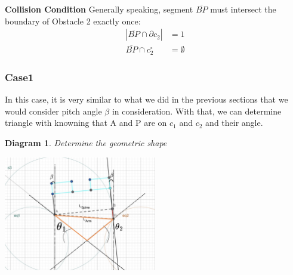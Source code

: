 \documentclass[11pt]{article}
\newtheorem{diagram}[statement]{Diagram}
\begin{document}

\vspace{1em}
\noindent\textbf{Collision Condition}
Generally speaking, segment \(\overline{BP}\)  must intersect the boundary of Obstacle 2 exactly once:
\begin{align*}
    \left| \overline{BP} \cap \partial c_2 \right| &= 1 \\
    \overline{BP} \cap c_2^\circ &= \emptyset
\end{align*}


\subsubsection*{Case1}
\indent \indent In this case, it is very similar to what we did in the previous sections that we would consider 
pitch angle \(\beta\) in consideration. With that, we can determine triangle with knowning that A and P are 
on \(c_1\) and \(c_2\) and their angle.

\begin{diagram}
    Determine the geometric shape
\end{diagram}
\vspace{1ex} %
\begin{center}
    \includegraphics[width=0.5\textwidth]{figs/Cylinder-Case1-Supplementary.jpg} %
\end{center}
\end{document}
